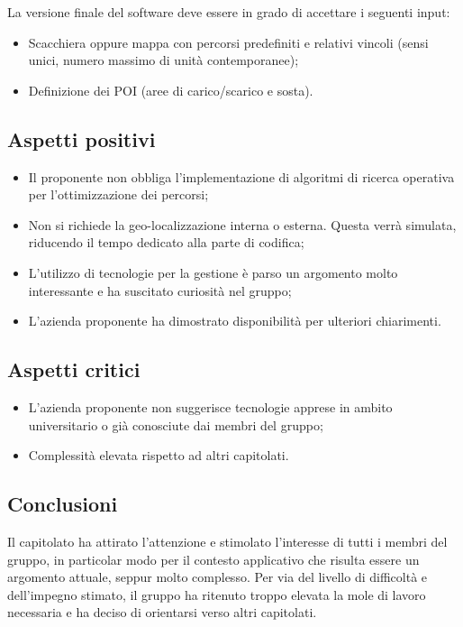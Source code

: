 La versione finale del software deve essere in grado di accettare i seguenti input:
\begin{itemize}
\item Scacchiera oppure mappa con percorsi predefiniti e relativi vincoli (sensi unici, numero massimo di unità contemporanee);
\item Definizione dei POI (aree di carico/scarico e sosta).
\end{itemize}

\subsection{Aspetti positivi}
\begin{itemize}
\item Il proponente non obbliga l'implementazione di algoritmi di ricerca operativa per l'ottimizzazione dei percorsi;
\item Non si richiede la geo-localizzazione interna o esterna. Questa verrà simulata, riducendo il tempo dedicato alla parte di codifica;
\item L'utilizzo di tecnologie per la gestione  è parso un argomento molto interessante e ha suscitato curiosità nel gruppo;
\item L'azienda proponente ha dimostrato disponibilità per ulteriori chiarimenti.
\end{itemize}

\subsection{Aspetti critici}
\begin{itemize}
	\item  L'azienda proponente non suggerisce tecnologie apprese in ambito universitario o già conosciute dai membri del gruppo;
	\item  Complessità elevata rispetto ad altri capitolati.
\end{itemize}

\subsection{Conclusioni}
Il capitolato ha attirato l'attenzione e stimolato l'interesse di tutti i membri del gruppo, in particolar modo per il contesto applicativo che risulta essere un argomento attuale, seppur molto complesso.
Per via del livello di difficoltà e dell'impegno stimato, il gruppo ha ritenuto troppo elevata la mole di lavoro necessaria e ha deciso di orientarsi verso altri capitolati. 

